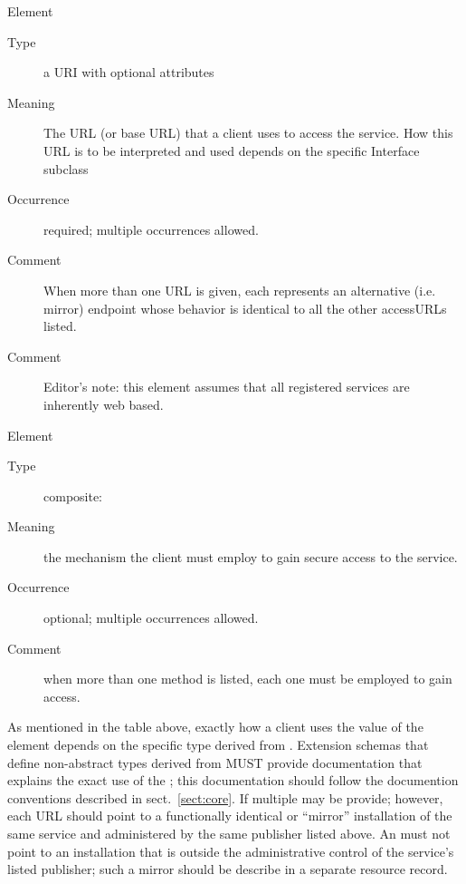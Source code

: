 \documentclass[11pt,a4paper]{ivoa}
\begin{document}
\begingroup\small\begin{bigdescription}\item[Element \xmlel{accessURL}]
\begin{description}
\item[Type] a URI with optional attributes
\item[Meaning] 
                 The URL (or base URL) that a client uses to access the
                 service.  How this URL is to be interpreted and used 
                 depends on the specific Interface subclass
               
\item[Occurrence] required; multiple occurrences allowed.
\item[Comment] 
                 When more than one URL is given, each represents an
                 alternative (i.e. mirror) endpoint whose behavior is
                 identical to all the other accessURLs listed.  
               
\item[Comment] 
                 Editor's note: this element assumes that
                 all registered services are inherently web based.
               

\end{description}
\item[Element \xmlel{securityMethod}]
\begin{description}
\item[Type] composite: 
\item[Meaning] 
                  the mechanism the client must employ to gain secure
                  access to the service.  
               
\item[Occurrence] optional; multiple occurrences allowed.
\item[Comment] 
                  when more than one method is listed, each one must
                  be employed to gain access.  
               

\end{description}


\end{bigdescription}\endgroup

\endgroup


As mentioned in the table above, exactly how a client uses the value
of the  element depends on the specific
type derived from .  Extension schemas that
define non-abstract types derived from  MUST
provide documentation that explains the exact use of the
; this documentation should follow the
documention conventions described in sect.~\ref{sect:core}.  If multiple
 may be provide; however, each URL should
point to a functionally identical or ``mirror'' installation of the same
service and administered by the same publisher listed above.  An
 must not point to an installation
that is outside the administrative control of the service's listed
publisher; such a mirror should be describe in a separate resource
record.  
\end{document}
